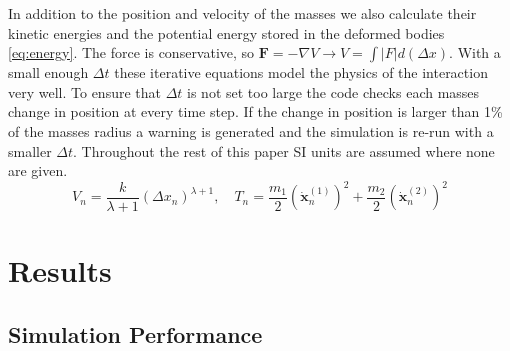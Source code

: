 \documentclass[aps,prl,floatfix,preprint,nofootinbib]{revtex4}
\begin{document}
In addition to the position and velocity of the masses we also calculate their kinetic energies and the potential energy stored in the deformed bodies \eqref{eq:energy}. The force is conservative, so $\mathbf{F} = - \nabla V \rightarrow V = \int \left|F\right| d\left(\Delta x\right)$. With a small enough $\Delta t$ these iterative equations model the physics of the interaction very well. To ensure that $\Delta t$ is not set too large the code checks each masses change in position at every time step. If the change in position is larger than 1\% of the masses radius a warning is generated and the simulation is re-run with a smaller $\Delta t$. Throughout the rest of this paper SI units are assumed where none are given.
\begin{equation}\label{eq:energy}
  V_n = \frac{k}{\lambda+1}\left(\Delta x_n\right)^{\lambda+1},\quad T_n = \frac{m_1}{2}\left(\dot{\mathbf{x}}^{(1)}_n\right)^2 + \frac{m_2}{2}\left(\dot{\mathbf{x}}^{(2)}_n\right)^2
\end{equation}

\section{Results}
\subsection{Simulation Performance}
\end{document}
